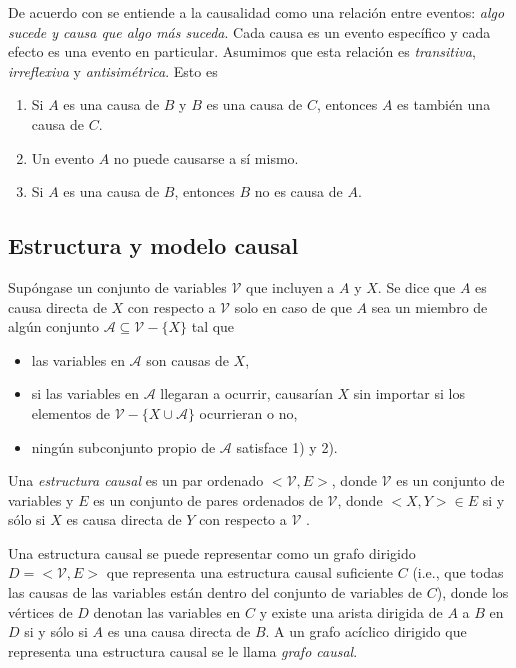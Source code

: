 De acuerdo con \cite{spirtes2000causation} se entiende a la causalidad 
como una relación entre eventos: \textit{algo sucede y causa que algo más suceda}. Cada causa es un evento específico y cada efecto es una evento
en particular. Asumimos que esta relación es \textit{transitiva}, \textit{irreflexiva} y \textit{antisimétrica}. Esto es 
\begin{enumerate}
    \item Si $A$ es una causa de $B$ y $B$ es una causa de $C$, entonces
    $A$ es también una causa de $C$.
    \item Un evento $A$ no puede causarse a sí mismo.
    \item Si $A$ es una causa de $B$, entonces $B$ no es causa de $A$.
\end{enumerate}

\subsection{Estructura y modelo causal}

Supóngase un conjunto de variables $\mathcal{V}$ que incluyen a $A$ y $X$. 
Se dice que $A$ es causa directa de $X$ con respecto a $\mathcal{V}$
solo en caso de que $A$ sea un miembro de algún conjunto 
$\mathcal{A} \subseteq \mathcal{V} - \{X\}$ tal que 

\begin{itemize}
    \item las variables en $\mathcal{A}$ son causas de $X$,
    \item si las variables en $\mathcal{A}$ llegaran a ocurrir,
    causarían $X$ sin importar si los elementos de $\mathcal{V} - \{X \cup \mathcal{A}\}$ ocurrieran o no,
    \item ningún subconjunto propio de $\mathcal{A}$ satisface
    1) y 2).
\end{itemize}

Una \textit{estructura causal} es un par ordenado $<\mathcal{V}, E>$, donde
$\mathcal{V}$ es un conjunto de variables y $E$ es un conjunto
de pares ordenados de $\mathcal{V}$, donde $<X, Y> \in E$ si
y sólo si $X$ es causa directa de $Y$ con respecto a  
$\mathcal{V}$ \cite{spirtes2000causation}.

Una estructura causal se puede representar como un grafo
dirigido $D = <\mathcal{V},E>$ que representa una estructura causal suficiente $C$ (i.e., que todas las causas de las variables están dentro del conjunto de variables de $C$), donde los vértices de $D$ denotan las variables en $C$ y existe una
arista dirigida de $A$ a $B$ en $D$ si y sólo si $A$ es
una causa directa de $B$.
A un grafo acíclico dirigido que representa una estructura causal se le llama \textit{grafo causal}.

